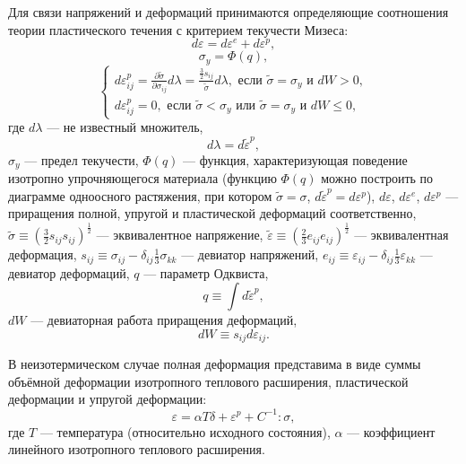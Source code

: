 Для связи напряжений и деформаций принимаются определяющие соотношения теории пластического течения \cite{Korobeynikov2000} с критерием текучести Мизеса:
\begin{equation}
d\varepsilon=d\varepsilon^{e} + d\varepsilon^{p},
\label{F:F_Flow1}
\end{equation}
\begin{equation}
\sigma_{y}=\Phi\left(q\right),
\label{F:F_Flow2}
\end{equation}
\begin{equation}
\begin{cases}
d\varepsilon_{ij}^{p}=\frac{\partial\tilde{\sigma}}{\partial\sigma_{ij}}d\lambda=\frac{\frac{3}{2}s_{ij}}{\tilde{\sigma}} d\lambda, \mbox{ если } \tilde{\sigma}=\sigma_{y} \mbox{ и } dW>0, \\
d\varepsilon_{ij}^{p}=0, \mbox{ если } \tilde{\sigma}<\sigma_{y} \mbox{ или } \tilde{\sigma}=\sigma_{y} \mbox{ и } dW\leq 0,
\end{cases}
\label{F:F_Flow3}
\end{equation}
где $d\lambda$ --- не известный множитель,
\begin{equation}
d\lambda=d\tilde{\varepsilon}^{p},
\label{F:F_FlowDef1}
\end{equation}
$\sigma_{y}$ --- предел текучести, $\Phi\left(q\right)$ --- функция, характеризующая поведение изотропно упрочняющегося материала (функцию $\Phi\left(q\right)$ можно построить по диаграмме одноосного растяжения, при котором $\tilde{\sigma}=\sigma$, $d\tilde{\varepsilon}^{p}=d\varepsilon^{p}$),
$d\varepsilon$, $d\varepsilon^{e}$, $d\varepsilon^{p}$ --- приращения полной, упругой и пластической деформаций соответственно, $\tilde{\sigma}\equiv\left(\frac{3}{2}s_{ij}s_{ij}\right)^{\frac{1}{2}}$ --- эквивалентное напряжение, $\tilde{\varepsilon}\equiv \left(\frac{2}{3}e_{ij}e_{ij}\right)^{\frac{1}{2}}$ --- эквивалентная деформация, $s_{ij}\equiv\sigma_{ij}-\delta_{ij}\frac{1}{3}\sigma_{kk}$ --- девиатор напряжений, $e_{ij}\equiv\varepsilon_{ij}-\delta_{ij}\frac{1}{3}\varepsilon_{kk}$ --- девиатор деформаций, $q$ --- параметр Одквиста,
\begin{equation}
q\equiv\int d\tilde{\varepsilon}^{p},
\label{F:F_FlowDef6}
\end{equation}
$dW$ --- девиаторная работа приращения деформаций,
\begin{equation}
dW\equiv s_{ij}d\varepsilon_{ij}.
\label{F:F_FlowDef7}
\end{equation}

В неизотермическом случае полная деформация представима в виде суммы объёмной деформации изотропного теплового расширения, пластической деформации и упругой деформации:
\begin{equation}
\varepsilon=\alpha T\delta+\varepsilon^p+C^{-1}:\sigma,
\end{equation}
где $T$ --- температура (относительно исходного состояния), $\alpha$ --- коэффициент линейного изотропного теплового расширения.


